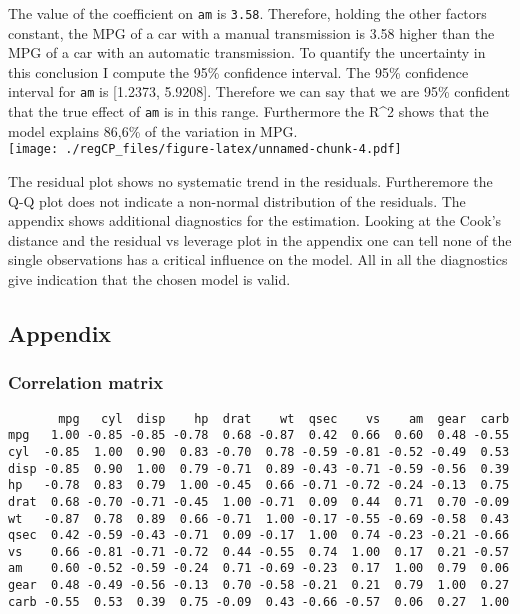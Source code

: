 \documentclass[5pt,]{article}
\begin{document}
The value of the coefficient on \texttt{am} is \texttt{3.58}. Therefore,
holding the other factors constant, the MPG of a car with a manual
transmission is 3.58 higher than the MPG of a car with an automatic
transmission. To quantify the uncertainty in this conclusion I compute
the 95\% confidence interval. The 95\% confidence interval for
\texttt{am} is {[}1.2373, 5.9208{]}. Therefore we can say that we are
95\% confident that the true effect of \texttt{am} is in this range.
Furthermore the R\^{}2 shows that the model explains 86,6\% of the
variation in
MPG.\\\texttt{[image: ./regCP\_files/figure-latex/unnamed-chunk-4.pdf]}

The residual plot shows no systematic trend in the residuals.
Furtheremore the Q-Q plot does not indicate a non-normal distribution of
the residuals. The appendix shows additional diagnostics for the
estimation. Looking at the Cook's distance and the residual vs leverage
plot in the appendix one can tell none of the single observations has a
critical influence on the model. All in all the diagnostics give
indication that the chosen model is valid.

\subsection{Appendix}\label{appendix}

\subsubsection{Correlation matrix}\label{correlation-matrix}

\begin{verbatim}
       mpg   cyl  disp    hp  drat    wt  qsec    vs    am  gear  carb
mpg   1.00 -0.85 -0.85 -0.78  0.68 -0.87  0.42  0.66  0.60  0.48 -0.55
cyl  -0.85  1.00  0.90  0.83 -0.70  0.78 -0.59 -0.81 -0.52 -0.49  0.53
disp -0.85  0.90  1.00  0.79 -0.71  0.89 -0.43 -0.71 -0.59 -0.56  0.39
hp   -0.78  0.83  0.79  1.00 -0.45  0.66 -0.71 -0.72 -0.24 -0.13  0.75
drat  0.68 -0.70 -0.71 -0.45  1.00 -0.71  0.09  0.44  0.71  0.70 -0.09
wt   -0.87  0.78  0.89  0.66 -0.71  1.00 -0.17 -0.55 -0.69 -0.58  0.43
qsec  0.42 -0.59 -0.43 -0.71  0.09 -0.17  1.00  0.74 -0.23 -0.21 -0.66
vs    0.66 -0.81 -0.71 -0.72  0.44 -0.55  0.74  1.00  0.17  0.21 -0.57
am    0.60 -0.52 -0.59 -0.24  0.71 -0.69 -0.23  0.17  1.00  0.79  0.06
gear  0.48 -0.49 -0.56 -0.13  0.70 -0.58 -0.21  0.21  0.79  1.00  0.27
carb -0.55  0.53  0.39  0.75 -0.09  0.43 -0.66 -0.57  0.06  0.27  1.00
\end{verbatim}
\end{document}
